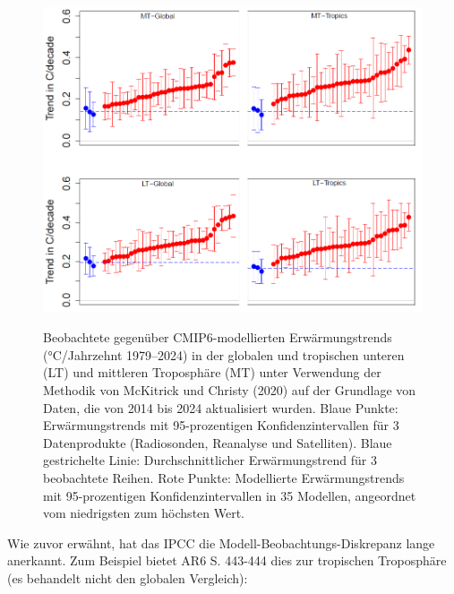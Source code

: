 \documentclass[12pt,paper=a4,DIV=12,parskip=never,chapterprefix=false,headings=standardclasses]{scrreprt}
\begin{document}
\begin{figure}[H]
\begin{center}
\includegraphics[width=1.0\textwidth]{bilder/bilderKlima-0028.png}\\[1cm]
\end{center}
\caption{Beobachtete gegenüber CMIP6-modellierten Erwärmungstrends (°C/Jahrzehnt 1979–2024) in der globalen
und tropischen unteren (LT) und mittleren Troposphäre (MT) unter Verwendung der Methodik von McKitrick und Christy
(2020) auf der Grundlage von Daten, die von 2014 bis 2024 aktualisiert wurden. Blaue Punkte: Erwärmungstrends mit 95-prozentigen Konfidenzintervallen
für 3 Datenprodukte (Radiosonden, Reanalyse und Satelliten). Blaue gestrichelte Linie: Durchschnittlicher Erwärmungstrend
für 3 beobachtete Reihen. Rote Punkte: Modellierte Erwärmungstrends mit 95-prozentigen Konfidenzintervallen
in 35 Modellen, angeordnet vom niedrigsten zum höchsten Wert.}
\end{figure}


Wie zuvor erwähnt, hat das IPCC die Modell-Beobachtungs-Diskrepanz lange anerkannt. Zum Beispiel bietet AR6 S. 443-444 dies zur tropischen Troposphäre (es behandelt nicht den globalen Vergleich):
\end{document}
